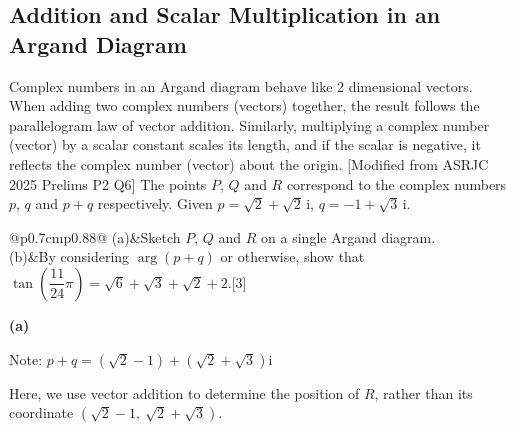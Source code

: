 \clearpage
\subsection{Addition and Scalar Multiplication in an Argand Diagram}
Complex numbers in an Argand diagram behave like 2 dimensional vectors. When adding two complex numbers (vectors) together, the result follows the parallelogram law of vector addition. Similarly, multiplying a complex number (vector) by a scalar constant scales its length, and if the scalar is negative, it reflects the complex number (vector) about the origin.
\exlab
{\small[Modified from ASRJC 2025 Prelims P2 Q6]} The points $P$, $Q$ and $R$ correspond to the complex numbers $p$, $q$ and $p+q$ respectively. Given $p=\sqrt2+\sqrt2\,\mathrm{i}$, $q=-1+\sqrt3\,\mathrm{i}$.\par\noindent
\begin{tabular}{@{}p{0.7cm}p{0.88\linewidth}@{}}
(a)&Sketch $P$, $Q$ and $R$ on a single Argand diagram.\\
(b)&By considering $\arg(p+q)$ or otherwise, show that $\tan\left(\dfrac{11}{24}\pi\right)=\sqrt6+\sqrt3+\sqrt2+2$.\hfill[3]
\end{tabular}\par
\textbf{(a)}


\noindent\begin{minipage}[c]{0.55\linewidth}\centering
{}
\end{minipage}\hfill\begin{minipage}[c]{0.42\linewidth}{\color{gray}Note: $p+q=\left(\sqrt2-1\right)+\left(\sqrt2+\sqrt3\right)\mathrm{i}$\par\medskip Here, we use vector addition to determine the position of $R$, rather than its coordinate $\left(\sqrt2-1,\ \sqrt2+\sqrt3\right)$.}\end{minipage}\par

